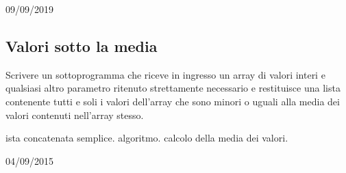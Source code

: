\begin{esame}
09/09/2019
\end{esame}




\subsection{Valori sotto la media}
Scrivere un sottoprogramma che riceve in ingresso un array di valori interi e qualsiasi altro parametro ritenuto strettamente necessario e restituisce una lista contenente tutti e soli i valori dell'array che sono minori o uguali alla media dei valori contenuti nell'array stesso.

\begin{tags}
ista concatenata semplice. algoritmo. calcolo della media dei valori.
\end{tags}

\begin{esame}
04/09/2015
\end{esame}


 